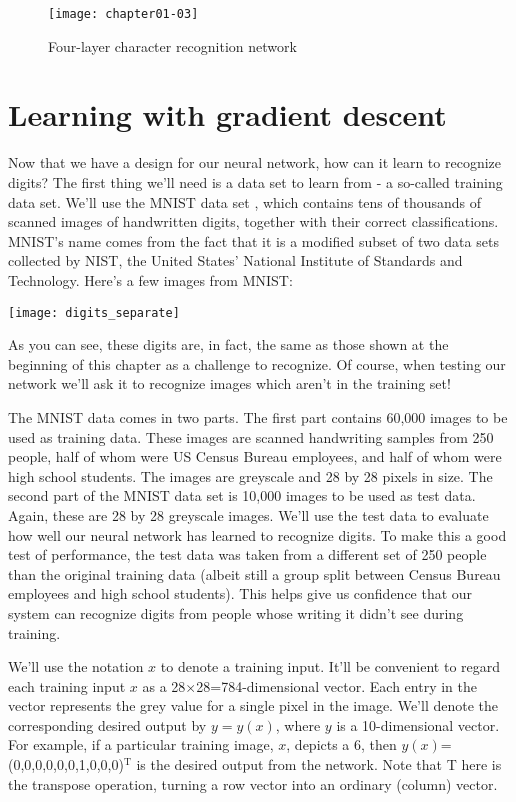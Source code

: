\begin{figure}[tbhp]
\centering
\texttt{[image: chapter01-03]}
\caption{Four-layer character recognition network}
\label{fig:chapter01-03}
\end{figure}


\section{Learning with gradient descent}

Now that we have a design for our neural network, how can it learn to recognize digits? The first thing we'll need is a data set to learn from - a so-called training data set. We'll use the MNIST data set \cite{LeCun2019}, which contains tens of thousands of scanned images of handwritten digits, together with their correct classifications. MNIST's name comes from the fact that it is a modified subset of two data sets collected by NIST, the United States' National Institute of Standards and Technology. Here's a few images from MNIST:

\begin{marginfigure}
\texttt{[image: digits\_separate]}
\end{marginfigure}

As you can see, these digits are, in fact, the same as those shown at the beginning of this chapter as a challenge to recognize. Of course, when testing our network we'll ask it to recognize images which aren't in the training set!

The MNIST data comes in two parts. The first part contains 60,000 images to be used as training data. These images are scanned handwriting samples from 250 people, half of whom were US Census Bureau employees, and half of whom were high school students. The images are greyscale and 28 by 28 pixels in size. The second part of the MNIST data set is 10,000 images to be used as test data. Again, these are 28 by 28 greyscale images. We'll use the test data to evaluate how well our neural network has learned to recognize digits. To make this a good test of performance, the test data was taken from a different set of 250 people than the original training data (albeit still a group split between Census Bureau employees and high school students). This helps give us confidence that our system can recognize digits from people whose writing it didn't see during training.

We'll use the notation $x$ to denote a training input. It'll be convenient to regard each training input $x$ as a 28$\times$28=784-dimensional vector. Each entry in the vector represents the grey value for a single pixel in the image. We'll denote the corresponding desired output by $y=y(x)$, where $y$ is a 10-dimensional vector. For example, if a particular training image, $x$, depicts a 6, then $y(x)$=(0,0,0,0,0,0,1,0,0,0)$^\textrm{T}$ is the desired output from the network. Note that T here is the transpose operation, turning a row vector into an ordinary (column) vector.

